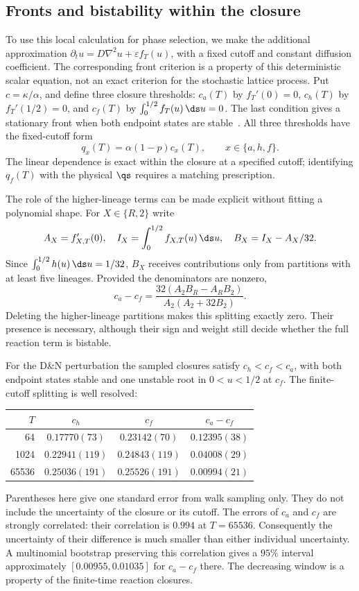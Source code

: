 \subsection{Fronts and bistability within the closure}

To use this local calculation for phase selection, we make the additional
approximation
$\partial_tu=D\nabla^2u+\varepsilon f_T(u)$, with a fixed cutoff and constant
diffusion coefficient. The corresponding front criterion is a property of this
deterministic scalar equation, not an exact criterion for the stochastic lattice
process. Put $c=\kappa/\alpha$, and define three closure thresholds:
$c_a(T)$ by $f_T'(0)=0$, $c_h(T)$ by $f_T'(1/2)=0$, and $c_f(T)$ by
$\int_0^{1/2}f_T(u)\,\ds u=0$. The last condition gives a stationary front when
both endpoint states are stable~\cite{durrett1994b,durrett2009}. All three
thresholds have the fixed-cutoff form
\begin{equation}
 q_x(T)=\alpha(1-p)c_x(T),\qquad x\in\{a,h,f\}.
 \label{eq:line}
\end{equation}
The linear dependence is exact within the closure at a specified cutoff;
identifying $q_f(T)$ with the physical $\qs$ requires a matching prescription.

The role of the higher-lineage terms can be made explicit without fitting a
polynomial shape. For $X\in\{R,2\}$ write
\[
 A_X=f_{X,T}'(0),\quad
 I_X=\int_0^{1/2}f_{X,T}(u)\,\ds u,\quad
 B_X=I_X-A_X/32.
\]
Since $\int_0^{1/2}h(u)\,\ds u=1/32$, $B_X$ receives contributions only from
partitions with at least five lineages. Provided the denominators are nonzero,
\begin{equation}
 c_a-c_f=
 \frac{32(A_2B_R-A_RB_2)}{A_2(A_2+32B_2)}.
 \label{eq:lineagesplitting}
\end{equation}
Deleting the higher-lineage partitions makes this splitting exactly zero.
Their presence is necessary, although their sign and weight still decide whether
the full reaction term is bistable.

For the D\&N perturbation the sampled closures satisfy $c_h<c_f<c_a$, with both
endpoint states stable and one unstable root in $0<u<1/2$ at $c_f$.
The finite-cutoff splitting is well resolved:
\begin{center}
\begin{tabular}{rccc}
$T$ & $c_h$ & $c_f$ & $c_a-c_f$\\
\hline
64 & $0.17770(73)$ & $0.23142(70)$ & $0.12395(38)$\\
1024 & $0.22941(119)$ & $0.24843(119)$ & $0.04008(29)$\\
65536 & $0.25036(191)$ & $0.25526(191)$ & $0.00994(21)$
\end{tabular}
\end{center}
Parentheses here give one standard error from walk sampling only. They do not
include the uncertainty of the closure or its cutoff. The errors of $c_a$ and
$c_f$ are strongly correlated: their correlation is $0.994$ at $T=65536$.
Consequently the uncertainty of their difference is much smaller than either
individual uncertainty. A multinomial bootstrap preserving this correlation
gives a $95\%$ interval approximately $[0.00955,0.01035]$ for $c_a-c_f$ there.
The decreasing window is a property of the finite-time reaction closures.

